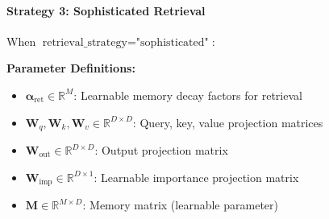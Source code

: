 \documentclass{article}
\begin{document}
\paragraph{Strategy 3: Sophisticated Retrieval}

When $\text{retrieval\_strategy} = \text{"sophisticated"}$:

\textbf{Parameter Definitions:}
\begin{itemize}
\item $\boldsymbol{\alpha}_{\text{ret}} \in \mathbb{R}^{M}$: Learnable memory decay factors for retrieval
\item $\mathbf{W}_q, \mathbf{W}_k, \mathbf{W}_v \in \mathbb{R}^{D \times D}$: Query, key, value projection matrices
\item $\mathbf{W}_{\text{out}} \in \mathbb{R}^{D \times D}$: Output projection matrix
\item $\mathbf{W}_{\text{imp}} \in \mathbb{R}^{D \times 1}$: Learnable importance projection matrix
\item $\mathbf{M} \in \mathbb{R}^{M \times D}$: Memory matrix (learnable parameter)
\end{itemize}
\end{document}
